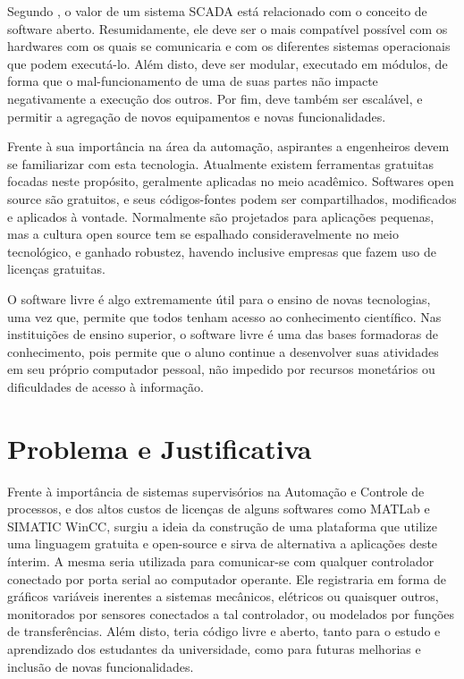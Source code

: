 Segundo \cite{junior2019}, o valor de um sistema SCADA está relacionado com o conceito de software aberto. Resumidamente, ele deve ser o mais compatível possível com os hardwares com os quais se comunicaria e com os diferentes sistemas operacionais que podem executá-lo. Além disto, deve ser modular, executado em módulos, de forma que o mal-funcionamento de uma de suas partes não impacte negativamente a execução dos outros. Por fim, deve também ser escalável, e permitir a agregação de novos equipamentos e novas funcionalidades.

Frente à sua importância na área da automação, aspirantes a engenheiros devem se familiarizar com esta tecnologia. Atualmente existem ferramentas gratuitas focadas neste propósito, geralmente aplicadas no meio acadêmico. Softwares open source são gratuitos, e seus códigos-fontes podem ser compartilhados, modificados e aplicados à vontade. Normalmente são projetados para aplicações pequenas, mas a cultura open source tem se espalhado consideravelmente no meio tecnológico, e ganhado robustez, havendo inclusive empresas que fazem uso de licenças gratuitas.

O software livre é algo extremamente útil para o ensino de novas tecnologias, uma vez que, permite que todos tenham acesso ao conhecimento científico. Nas instituições de ensino superior, o software livre é uma das bases formadoras de conhecimento, pois permite que o aluno continue a desenvolver suas atividades em seu próprio computador pessoal, não impedido por recursos monetários ou dificuldades de acesso à informação. \cite{silva2013}

\section{Problema e Justificativa}

Frente à importância de sistemas supervisórios na Automação e Controle de processos, e dos altos custos de licenças de alguns softwares como MATLab\textsuperscript{\tiny \textregistered} e SIMATIC WinCC, surgiu a ideia da construção de uma plataforma que utilize uma linguagem gratuita e open-source e sirva de alternativa a aplicações deste ínterim. A mesma seria utilizada para comunicar-se com qualquer controlador conectado por porta serial ao computador operante. Ele registraria em forma de gráficos variáveis inerentes a sistemas mecânicos, elétricos ou quaisquer outros, monitorados por sensores conectados a tal controlador, ou modelados por funções de transferências. Além disto, teria código livre e aberto, tanto para o estudo e aprendizado dos estudantes da universidade, como para futuras melhorias e inclusão de novas funcionalidades.


